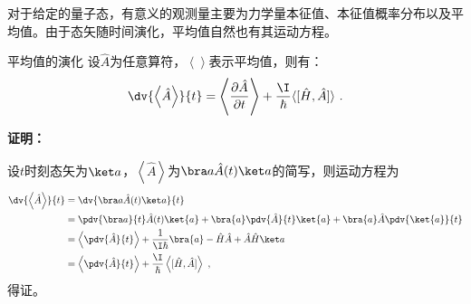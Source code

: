 

对于给定的量子态，有意义的观测量主要为力学量本征值、本征值概率分布以及平均值。由于态矢随时间演化，平均值自然也有其运动方程。
\begin{theorem}{平均值的演化}
设$\hat A$为任意算符，$\left\langle\right\rangle$表示平均值，则有：
\begin{equation}\label{eq_Ehrenf_3}
\dv{\left\langle \hat A \right\rangle}{t}=\left\langle\frac{\partial \hat A}{\partial t}\right\rangle+\frac{\I}{\hbar}\langle[\hat H, \hat A]\rangle~.
\end{equation}
\end{theorem}

\textbf{证明：}

设$t$时刻态矢为$\ket a$，$\left\langle \hat A\right\rangle$为$\bra a \hat A(t)\ket a$的简写，则运动方程为
\begin{equation}
\begin{aligned}
\dv{\left\langle \hat A \right\rangle}{t}&=\dv{\bra a \hat A(t)\ket a}{t}\\
&=\pdv{\bra a}{t}\hat A(t)\ket{a}+\bra{a}\pdv{\hat A}{t}\ket{a}+\bra{a}\hat A\pdv{\ket{a}}{t}\\
&=\left\langle \pdv{\hat A}{t}\right\rangle+\frac{1}{\I\hbar}\bra{a}-\hat H\hat A+\hat A\hat H\ket a\\
&=\left\langle \pdv{\hat A}{t}\right\rangle+\frac{\I}{\hbar}\left\langle [\hat H,\hat A]\right\rangle~,
\end{aligned}
\end{equation}
得证。


